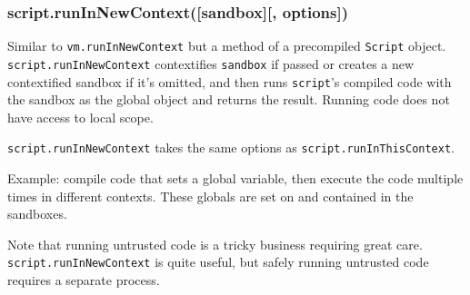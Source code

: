 \subsubsection{script.runInNewContext({[}sandbox{]}{[},
options{]})}\label{script.runinnewcontextsandbox-options}

Similar to \texttt{vm.runInNewContext} but a method of a precompiled
\texttt{Script} object. \texttt{script.runInNewContext} contextifies
\texttt{sandbox} if passed or creates a new contextified sandbox if it's
omitted, and then runs \texttt{script}'s compiled code with the sandbox
as the global object and returns the result. Running code does not have
access to local scope.

\texttt{script.runInNewContext} takes the same options as
\texttt{script.runInThisContext}.

Example: compile code that sets a global variable, then execute the code
multiple times in different contexts. These globals are set on and
contained in the sandboxes.

\begin{Shaded}
\begin{Highlighting}[]
 \NormalTok{(}\NormalTok{);}
 \NormalTok{(}\NormalTok{);}

 

  \NormalTok{(}\NormalTok{);}

\NormalTok{(} 
\NormalTok{\});}

\NormalTok{(}

\end{Highlighting}
\end{Shaded}

Note that running untrusted code is a tricky business requiring great
care. \texttt{script.runInNewContext} is quite useful, but safely
running untrusted code requires a separate process.
